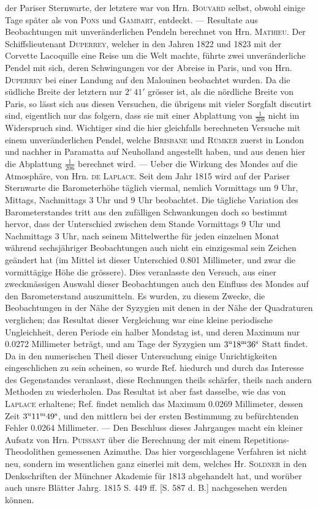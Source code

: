 der Pariser Sternwarte, der letztere war von Hrn. \textsc{Bouvard} selbst, obwohl einige Tage später als von \textsc{Pons} und \textsc{Gambart}, entdeckt. --- Resultate aus Beobachtungen mit unveränderlichen Pendeln berechnet von Hrn. \textsc{Mathieu}. Der Schiffslieutenant \textsc{Duperrey}, welcher in den Jahren 1822 und 1823 mit der Corvette Lacoquille eine Reise um die Welt machte, führte zwei unveränderliche Pendel mit sich, deren Schwingungen vor der Abreise in Paris, und von Hrn. \textsc{Duperrey} bei einer Landung auf den Malouinen beobachtet wurden. Da die südliche Breite der letztern nur $2^\circ\,41'$ grösser ist, als die nördliche Breite von Paris, so lässt sich aus diesen Versuchen, die übrigens mit vieler Sorgfalt discutirt sind, eigentlich nur das folgern, dass sie mit einer Abplattung von $\frac{1}{308}$ nicht im Widerspruch sind. Wichtiger sind die hier gleichfalls berechneten Versuche mit einem unveränderlichen Pendel, welche \textsc{Brisbane} und \textsc{Rümker} zuerst in London und nachher in Paramatta auf Neuholland angestellt haben, und aus denen hier die Abplattung $\frac{1}{206}$ berechnet wird. --- Ueber die Wirkung des Mondes auf die Atmosphäre, von Hrn. \textsc{de Laplace}. Seit dem Jahr 1815 wird auf der Pariser Sternwarte die Barometerhöhe täglich viermal, nemlich Vormittags um 9 Uhr, Mittags, Nachmittags 3 Uhr und 9 Uhr beobachtet. Die tägliche Variation des Barometerstandes tritt aus den zufälligen Schwankungen doch so bestimmt hervor, dass der Unterschied zwischen dem Stande Vormittags 9 Uhr und Nachmittags 3 Uhr, nach seinem Mittelwerthe für jeden einzelnen Monat während sechsjähriger Beobachtungen auch nicht ein einzigesmal sein Zeichen geändert hat (im Mittel ist dieser Unterschied 0.801 Millimeter, und zwar die vormittägige Höhe die grössere). Dies veranlasste den Versuch, aus einer zweckmässigen Auswahl dieser Beobachtungen auch den Einfluss des Mondes auf den Barometerstand auszumitteln. Es wurden, zu diesem Zwecke, die Beobachtungen in der Nähe der Syzygien mit denen in der Nähe der Quadraturen verglichen; das Resultat dieser Vergleichung war eine kleine periodische Ungleichheit, deren Periode ein halber Mondstag ist, und deren Maximum nur 0.0272 Millimeter beträgt, und am Tage der Syzygien um $3^{\rm u}18^{\rm m}36^{\rm s}$ Statt findet. Da in den numerischen Theil dieser Untersuchung einige Unrichtigkeiten eingeschlichen zu sein scheinen, so wurde Ref. hiedurch und durch das Interesse des Gegenstandes veranlasst, diese Rechnungen theils schärfer, theils nach andern Methoden zu wiederholen. Das Resultat ist aber fast dasselbe, wie das von \textsc{Laplace} erhaltene; Ref. findet nemlich das Maximum 0.0269 Millimeter, dessen Zeit $3^{\rm u}11^{\rm m}49^{\rm s}$, und den mittlern bei der ersten Bestimmung zu befürchtenden Fehler 0.0264 Millimeter. --- Den Beschluss dieses Jahrganges macht ein kleiner Aufsatz von Hrn. \textsc{Puissant} über die Berechnung der mit einem Repetitions-Theodolithen gemessenen Azimuthe. Das hier vorgeschlagene Verfahren ist nicht neu, sondern im wesentlichen ganz einerlei mit dem, welches Hr. \textsc{Soldner} in den Denkschriften der Münchner Akademie für 1813 abgehandelt hat, und worüber auch unsre Blätter Jahrg. 1815 S. 449 ff. [S. 587 d. B.] nachgesehen werden können.
